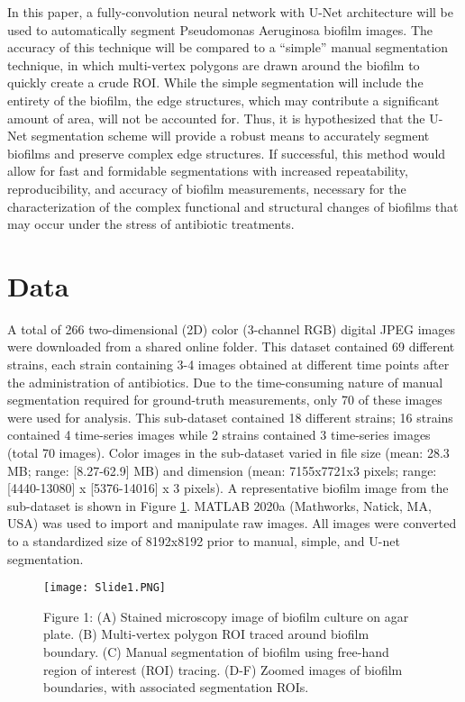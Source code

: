 \documentclass[conference]{IEEEtran}
\begin{document}
In this paper, a fully-convolution neural network with U-Net architecture will be used to automatically segment Pseudomonas Aeruginosa biofilm images. The accuracy of this technique will be compared to a “simple” manual segmentation technique, in which multi-vertex polygons are drawn around the biofilm to quickly create a crude ROI. While the simple segmentation will include the entirety of the biofilm, the edge structures, which may contribute a significant amount of area, will not be accounted for. Thus, it is hypothesized that the U-Net segmentation scheme will provide a robust means to accurately segment biofilms and preserve complex edge structures. If successful, this method would allow for fast and formidable segmentations with increased repeatability, reproducibility, and accuracy of biofilm measurements, necessary for the characterization of the complex functional and structural changes of biofilms that may occur under the stress of antibiotic treatments.

\section{Data}
A total of 266 two-dimensional (2D) color (3-channel RGB) digital JPEG images were downloaded from a shared online folder. This dataset contained 69 different strains, each strain containing 3-4 images obtained at different time points after the administration of antibiotics. Due to the time-consuming nature of manual segmentation required for ground-truth measurements, only 70 of these images were used for analysis. This sub-dataset contained 18 different strains; 16 strains contained 4 time-series images while 2 strains contained 3 time-series images (total 70 images). Color images in the sub-dataset varied in file size (mean: 28.3 MB; range: [8.27-62.9] MB) and dimension (mean: 7155x7721x3 pixels; range: [4440-13080] x [5376-14016] x 3 pixels). A representative biofilm image from the sub-dataset is shown in Figure \ref{figName1}. MATLAB 2020a (Mathworks, Natick, MA, USA) was used to import and manipulate raw images. All images were converted to a standardized size of 8192x8192 prior to manual, simple, and U-net segmentation. 

\begin{figure}[h]
\centering
\texttt{[image: Slide1.PNG]}
\caption{Figure 1: (A) Stained microscopy image of biofilm culture on agar plate. (B) Multi-vertex polygon ROI traced around biofilm boundary. (C) Manual segmentation of biofilm using free-hand region of interest (ROI) tracing. (D-F) Zoomed images of biofilm boundaries, with associated segmentation ROIs.}
\label{figName1}
\end{figure}
\end{document}
